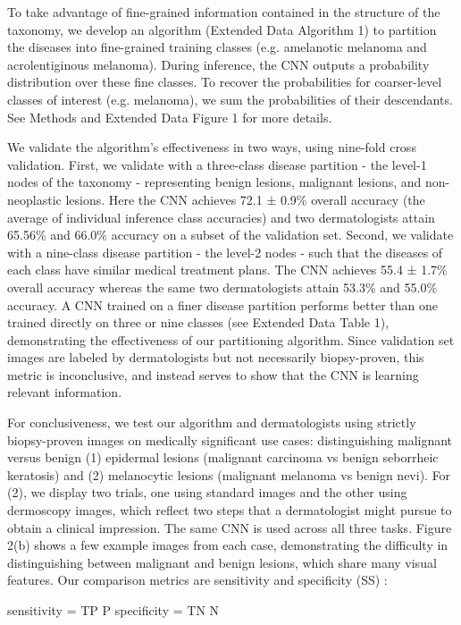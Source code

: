 To take advantage of fine-grained information contained in the structure of the taxonomy, we develop an algorithm (Extended Data Algorithm 1) to partition the diseases into fine-grained training classes (e.g. amelanotic melanoma and acrolentiginous melanoma). During inference, the CNN outputs a probability distribution over these fine classes. To recover the probabilities for coarser-level classes of interest (e.g. melanoma), we sum the probabilities of their descendants. See Methods and Extended Data Figure 1 for more details.

We validate the algorithm’s effectiveness in two ways, using nine-fold cross validation. First, we validate with a three-class disease partition - the level-1 nodes of the taxonomy - representing benign lesions, malignant lesions, and non-neoplastic lesions. Here the CNN achieves 72.1 ± 0.9\% overall accuracy (the average of individual inference class accuracies) and two dermatologists attain 65.56\% and 66.0\% accuracy on a subset of the validation set. Second, we validate with a nine-class disease partition - the level-2 nodes - such that the diseases of each class have similar medical treatment plans. The CNN achieves 55.4 ± 1.7\% overall accuracy whereas the same two dermatologists attain 53.3\% and 55.0\% accuracy. A CNN trained on a finer disease partition performs better than one trained directly on three or nine classes (see Extended Data Table 1), demonstrating the effectiveness of our partitioning algorithm. Since validation set images are labeled by dermatologists but not necessarily biopsy-proven, this metric is inconclusive, and instead serves to show that the CNN is learning relevant information.

For conclusiveness, we test our algorithm and dermatologists using strictly biopsy-proven images on medically significant use cases: distinguishing malignant versus benign (1) epidermal lesions (malignant carcinoma vs benign seborrheic keratosis) and (2) melanocytic lesions (malignant melanoma vs benign nevi). For (2), we display two trials, one using standard images and the other using dermoscopy images, which reflect two steps that a dermatologist might pursue to obtain a clinical impression. The same CNN is used across all three tasks. Figure 2(b) shows a few example images from each case, demonstrating the difficulty in distinguishing between malignant and benign lesions, which share many visual features. Our comparison metrics are sensitivity and specificity (SS) :

	sensitivity = TP P
	specificity = TN N

